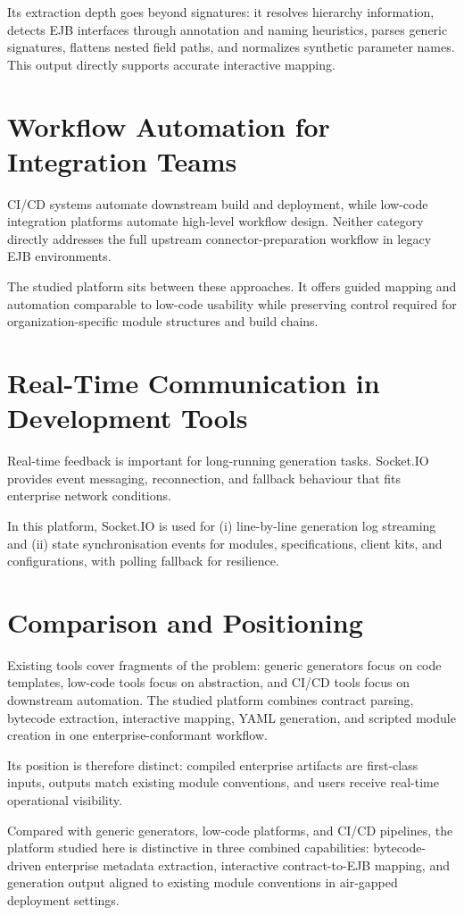 Its extraction depth goes beyond signatures: it resolves hierarchy information, detects EJB interfaces through annotation and naming heuristics, parses generic signatures, flattens nested field paths, and normalizes synthetic parameter names. This output directly supports accurate interactive mapping.

\section{Workflow Automation for Integration Teams}

CI/CD systems automate downstream build and deployment, while low-code integration platforms automate high-level workflow design. Neither category directly addresses the full upstream connector-preparation workflow in legacy EJB environments.

The studied platform sits between these approaches. It offers guided mapping and automation comparable to low-code usability while preserving control required for organization-specific module structures and build chains.

\section{Real-Time Communication in Development Tools}

Real-time feedback is important for long-running generation tasks. Socket.IO~\cite{socketio_docs} provides event messaging, reconnection, and fallback behaviour that fits enterprise network conditions.

In this platform, Socket.IO is used for (i) line-by-line generation log streaming and (ii) state synchronisation events for modules, specifications, client kits, and configurations, with polling fallback for resilience.

\section{Comparison and Positioning}

Existing tools cover fragments of the problem: generic generators focus on code templates, low-code tools focus on abstraction, and CI/CD tools focus on downstream automation. The studied platform combines contract parsing, bytecode extraction, interactive mapping, YAML generation, and scripted module creation in one enterprise-conformant workflow.

Its position is therefore distinct: compiled enterprise artifacts are first-class inputs, outputs match existing module conventions, and users receive real-time operational visibility.

Compared with generic generators, low-code platforms, and CI/CD pipelines, the platform studied here is distinctive in three combined capabilities: bytecode-driven enterprise metadata extraction, interactive contract-to-EJB mapping, and generation output aligned to existing module conventions in air-gapped deployment settings.
